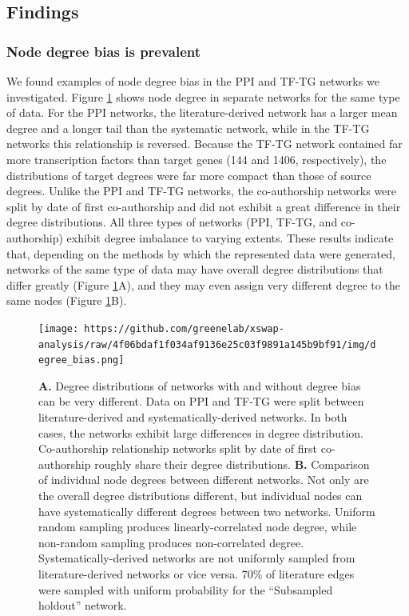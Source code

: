 \hypertarget{findings}{%
\subsection{Findings}\label{findings}}

\hypertarget{node-degree-bias-is-prevalent}{%
\subsubsection{Node degree bias is prevalent}\label{node-degree-bias-is-prevalent}}

We found examples of node degree bias in the PPI and TF-TG networks we investigated.
Figure \ref{fig:degree-bias} shows node degree in separate networks for the same type of data.
For the PPI networks, the literature-derived network has a larger mean degree and a longer tail than the systematic network, while in the TF-TG networks this relationship is reversed.
Because the TF-TG network contained far more transcription factors than target genes (144 and 1406, respectively), the distributions of target degrees were far more compact than those of source degrees.
Unlike the PPI and TF-TG networks, the co-authorship networks were split by date of first co-authorship and did not exhibit a great difference in their degree distributions.
All three types of networks (PPI, TF-TG, and co-authorship) exhibit degree imbalance to varying extents.
These results indicate that, depending on the methods by which the represented data were generated, networks of the same type of data may have overall degree distributions that differ greatly (Figure \ref{fig:degree-bias}A), and they may even assign very different degree to the same nodes (Figure \ref{fig:degree-bias}B).

\begin{figure}
\hypertarget{fig:degree-bias}{%
\centering
\texttt{[image: https://github.com/greenelab/xswap-analysis/raw/4f06bdaf1f034af9136e25c03f9891a145b9bf91/img/degree\_bias.png]}
\caption{\textbf{A.} Degree distributions of networks with and without degree bias can be very different.
Data on PPI and TF-TG were split between literature-derived and systematically-derived networks.
In both cases, the networks exhibit large differences in degree distribution.
Co-authorship relationship networks split by date of first co-authorship roughly share their degree distributions.
\textbf{B.} Comparison of individual node degrees between different networks.
Not only are the overall degree distributions different, but individual nodes can have systematically different degrees between two networks.
Uniform random sampling produces linearly-correlated node degree, while non-random sampling produces non-correlated degree.
Systematically-derived networks are not uniformly sampled from literature-derived networks or vice versa.
70\% of literature edges were sampled with uniform probability for the ``Subsampled holdout'' network.}\label{fig:degree-bias}
}
\end{figure}

